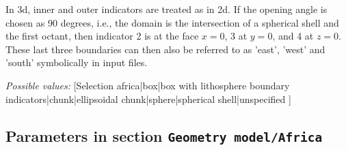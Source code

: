 \begin{itemize}
In 3d, inner and outer indicators are treated as in 2d. If the opening angle is chosen as 90 degrees, i.e., the domain is the intersection of a spherical shell and the first octant, then indicator 2 is at the face $x=0$, 3 at $y=0$, and 4 at $z=0$. These last three boundaries can then also be referred to as 'east', 'west' and 'south' symbolically in input files.


{\it Possible values:} [Selection africa|box|box with lithosphere boundary indicators|chunk|ellipsoidal chunk|sphere|spherical shell|unspecified ]
\end{itemize}



\subsection{Parameters in section \tt Geometry model/Africa}
\label{parameters:Geometry_20model/Africa}

